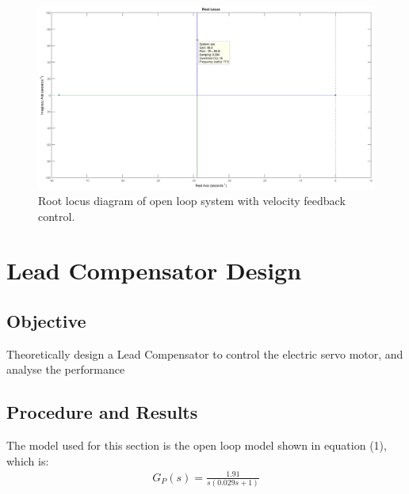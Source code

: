 \documentclass{article}
\begin{document}
\begin{figure}[H]
	\centering
	\includegraphics[scale=0.25]{fig25}
	\caption{Root locus diagram of open loop system with velocity feedback control.}
\end{figure}

\section{Lead Compensator Design}


\subsection{Objective}

Theoretically design a Lead Compensator to control the electric servo motor, and analyse the performance 

\subsection{Procedure and Results}

The model used for this section is the open loop model shown in equation (1), which is:
\begin{align*}
	G_P(s) = \frac{1.91}{s(0.029s + 1)}
\end{align*}
\end{document}
